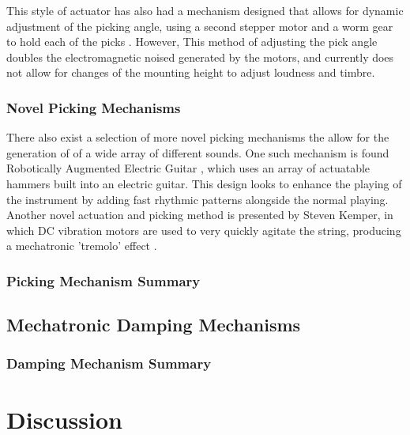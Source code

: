 \documentclass[a4paper,11pt]{article}
\begin{document}
This style of actuator has also had a mechanism designed that allows for dynamic adjustment of the picking angle, using a second stepper motor and a worm gear to hold each of the picks \cite{Carnegie2020}. However, This method of adjusting the pick angle doubles the electromagnetic noised generated by the motors, and currently does not allow for changes of the mounting height to adjust loudness and timbre. 

\subsubsection{Novel Picking Mechanisms}

There also exist a selection of more novel picking mechanisms the allow for the generation of of a wide array of different sounds. One such mechanism is found Robotically Augmented Electric Guitar \cite{Ogata2017}, which uses an array of actuatable hammers built into an electric guitar. This design looks to enhance the playing of the instrument by adding fast rhythmic patterns alongside the normal playing. Another novel actuation and picking method is presented by Steven Kemper, in which DC vibration motors are used to very quickly agitate the string, producing a mechatronic 'tremolo' effect \cite{Kemper2020}.

\subsubsection{Picking Mechanism Summary}



\subsection{Mechatronic Damping Mechanisms}



\subsubsection{Damping Mechanism Summary}



\section{Discussion}



\newpage


\end{document}
